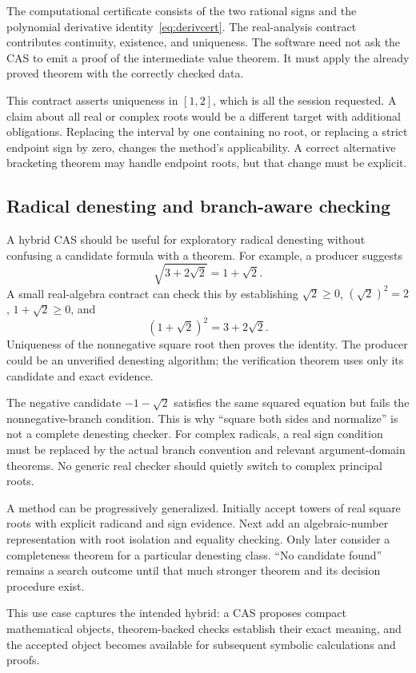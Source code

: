 \documentclass[11pt,a4paper]{article}
\theoremstyle{remark}\newtheorem{example}[proposition]{Example}
\begin{document}
The computational certificate consists of the two rational signs and the polynomial derivative identity~\eqref{eq:derivcert}. The real-analysis contract contributes continuity, existence, and uniqueness. The software need not ask the CAS to emit a proof of the intermediate value theorem. It must apply the already proved theorem with the correctly checked data.

This contract asserts uniqueness in $[1,2]$, which is all the session requested. A claim about all real or complex roots would be a different target with additional obligations. Replacing the interval by one containing no root, or replacing a strict endpoint sign by zero, changes the method's applicability. A correct alternative bracketing theorem may handle endpoint roots, but that change must be explicit.

\subsection{Radical denesting and branch-aware checking}\label{sec:radicals}
A hybrid CAS should be useful for exploratory radical denesting without confusing a candidate formula with a theorem. For example, a producer suggests
\[
 \sqrt{3+2\sqrt2}=1+\sqrt2.
\]
A small real-algebra contract can check this by establishing $\sqrt2\geq0$, $(\sqrt2)^2=2$, $1+\sqrt2\geq0$, and
\[
 (1+\sqrt2)^2=3+2\sqrt2.
\]
Uniqueness of the nonnegative square root then proves the identity. The producer could be an unverified denesting algorithm; the verification theorem uses only its candidate and exact evidence.

The negative candidate $-1-\sqrt2$ satisfies the same squared equation but fails the nonnegative-branch condition. This is why ``square both sides and normalize'' is not a complete denesting checker. For complex radicals, a real sign condition must be replaced by the actual branch convention and relevant argument-domain theorems. No generic real checker should quietly switch to complex principal roots.

A method can be progressively generalized. Initially accept towers of real square roots with explicit radicand and sign evidence. Next add an algebraic-number representation with root isolation and equality checking. Only later consider a completeness theorem for a particular denesting class. ``No candidate found'' remains a search outcome until that much stronger theorem and its decision procedure exist.

This use case captures the intended hybrid: a CAS proposes compact mathematical objects, theorem-backed checks establish their exact meaning, and the accepted object becomes available for subsequent symbolic calculations and proofs.
\end{document}
